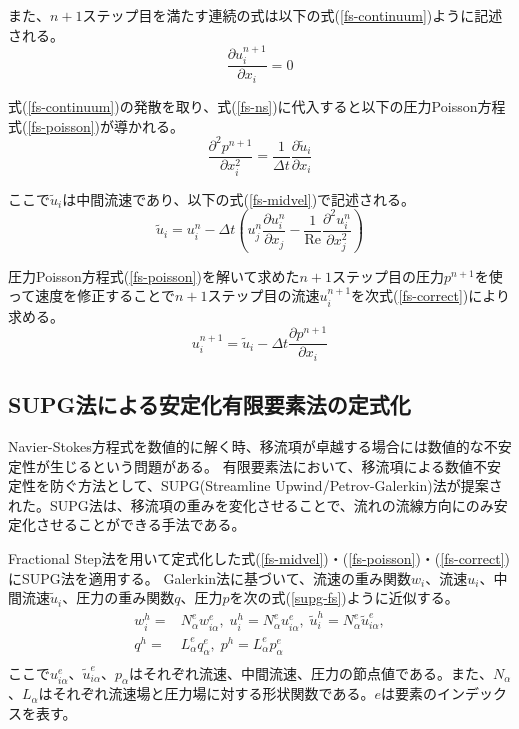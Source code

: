 \documentclass[8pt,a4paper]{article}
\begin{document}
また、$n+1$ステップ目を満たす連続の式は以下の式(\ref{fs-continuum})ように記述される。
\begin{equation}
\label{fs-continuum}
	\frac{\partial u_{i}^{n+1}}{\partial x_{i}}=0
\end{equation}

式(\ref{fs-continuum})の発散を取り、式(\ref{fs-ns})に代入すると以下の圧力Poisson方程式(\ref{fs-poisson})が導かれる。
\begin{equation}
\label{fs-poisson}
	\frac{\partial^2 p^{n+1}}{\partial x^{2}_i} = \frac{1}{\Delta t} \frac{\partial \tilde{u}_i}{\partial x_{i}}
\end{equation}

ここで$\tilde{u}_{i}$は中間流速であり、以下の式(\ref{fs-midvel})で記述される。
\begin{equation}
\label{fs-midvel}
	\tilde{u}_{i} = u_{i}^{n} - \Delta t
	\left(u_{j}^{n} \frac{\partial u_{i}^{n}}{\partial x_{j}} 
	- \frac{1}{\mathrm{Re}} \frac{\partial^{2} u_{i}^{n}}{\partial x_{j}^{2}}\right)
\end{equation}

圧力Poisson方程式(\ref{fs-poisson})を解いて求めた$n+1$ステップ目の圧力$p^{n+1}$を使って速度を修正することで$n+1$ステップ目の流速$u^{n+1}_{i}$を次式(\ref{fs-correct})により求める。
\begin{equation}
\label{fs-correct}
	u^{n+1}_i=\tilde{u}_i - \Delta t \frac{\partial p^{n+1}}{\partial x_i}
\end{equation}

\subsection{SUPG法による安定化有限要素法の定式化}
Navier-Stokes方程式を数値的に解く時、移流項が卓越する場合には数値的な不安定性が生じるという問題がある。
有限要素法において、移流項による数値不安定性を防ぐ方法として、SUPG(Streamline Upwind/Petrov-Galerkin)法が提案された。SUPG法は、移流項の重みを変化させることで、流れの流線方向にのみ安定化させることができる手法である。

Fractional Step法を用いて定式化した式(\ref{fs-midvel})・(\ref{fs-poisson})・(\ref{fs-correct})にSUPG法を適用する。
Galerkin法に基づいて、流速の重み関数$w_{i}$、流速$u_{i}$、中間流速$\tilde{u}_{i}$、圧力の重み関数$q$、圧力$p$を次の式(\ref{supg-fs})ように近似する。
\begin{equation}
\label{supg-fs}
	\begin{split}
		w_{i}^{h}=&N_{\alpha}^{e} w_{i\alpha}^{e},\; u_{i}^{h}=N_{\alpha}^{e} u_{i\alpha}^{e},\; 
		\tilde{u}_{i}^{h}=N_{\alpha}^{e} \tilde{u}_{i\alpha}^{e}, \\
		q^{h}=&L_{\alpha}^{e} q_{\alpha}^{e}, \; p^{h}=L_{\alpha}^{e} p_{\alpha}^{e} \\
	\end{split}
\end{equation}
ここで$u_{i\alpha}^{e}$、$\tilde{u}_{i\alpha}^{e}$、$p_{\alpha}$はそれぞれ流速、中間流速、圧力の節点値である。また、$N_{\alpha}$、$L_{\alpha}$はそれぞれ流速場と圧力場に対する形状関数である。$e$は要素のインデックスを表す。
\end{document}
